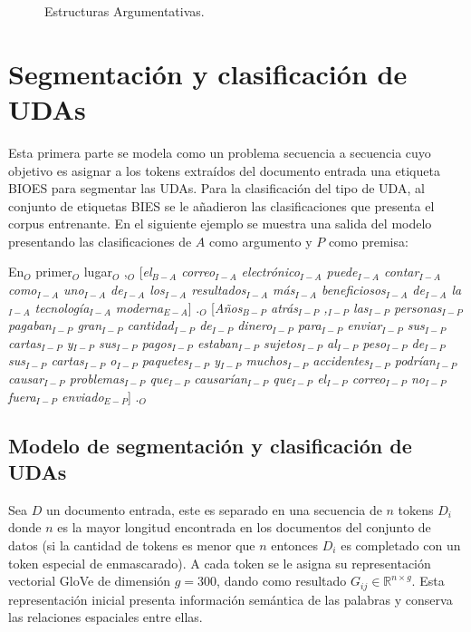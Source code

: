 \documentclass[a4paper,11pt,twocolumn,twoside]{article}
\begin{document}
\begin{figure}[h]
    \centering
    
    \caption{Estructuras Argumentativas.}
    \label{fig:arg_struct}
\end{figure}

\section{Segmentación y clasificación de UDAs}

Esta primera parte se modela como un problema secuencia a secuencia cuyo objetivo es asignar a los tokens 
extraídos del documento entrada una etiqueta BIOES para segmentar las UDAs. Para la clasificación del tipo 
de UDA, al conjunto de etiquetas BIES se le añadieron las clasificaciones que presenta el corpus entrenante.
En el siguiente ejemplo se muestra una salida del modelo presentando las clasificaciones de
$A$ como argumento y $P$ como premisa:

\begin{adjustwidth}{25pt}{25pt}
    En$_O$ primer$_O$ lugar$_O$ ,$_O$ [\textit{el$_{B-A}$ correo$_{I-A}$ electrónico$_{I-A}$ puede$_{I-A}$ 
    contar$_{I-A}$ como$_{I-A}$ uno$_{I-A}$ de$_{I-A}$ los$_{I-A}$ resultados$_{I-A}$
    más$_{I-A}$ beneficiosos$_{I-A}$ de$_{I-A}$ la$_{I-A}$ tecnología$_{I-A}$ moderna$_{E-A}$}] .$_{O}$ 
    [\textit{Años$_{B-P}$ atrás$_{I-P}$ ,$_{I-P}$ las$_{I-P}$ personas$_{I-P}$ pagaban$_{I-P}$ gran$_{I-P}$ cantidad$_{I-P}$ 
    de$_{I-P}$ dinero$_{I-P}$ para$_{I-P}$ enviar$_{I-P}$ sus$_{I-P}$ cartas$_{I-P}$ y$_{I-P}$ sus$_{I-P}$ 
    pagos$_{I-P}$ estaban$_{I-P}$ sujetos$_{I-P}$ al$_{I-P}$ peso$_{I-P}$ de$_{I-P}$ sus$_{I-P}$ 
    cartas$_{I-P}$ o$_{I-P}$ paquetes$_{I-P}$ y$_{I-P}$ muchos$_{I-P}$ accidentes$_{I-P}$ podrían$_{I-P}$
    causar$_{I-P}$ problemas$_{I-P}$ que$_{I-P}$ causarían$_{I-P}$ que$_{I-P}$ el$_{I-P}$ correo$_{I-P}$ 
    no$_{I-P}$ fuera$_{I-P}$ enviado$_{E-P}$}] .$_{O}$
\end{adjustwidth}

\subsection{Modelo de segmentación y clasificación de UDAs}

Sea $D$ un documento entrada, este es separado en una secuencia de $n$ tokens $D_i$ donde $n$ es la mayor longitud encontrada
en los documentos del conjunto de datos (si la cantidad de tokens es menor que $n$ entonces $D_i$ es completado con un token especial de enmascarado). 
A cada token se le asigna
su representación vectorial GloVe de dimensión $g=300$, dando como resultado $G_{ij} \in \mathbb{R}^{n \times g}$.
Esta representación inicial presenta información semántica de las palabras y conserva las relaciones 
espaciales entre ellas. 
\end{document}
